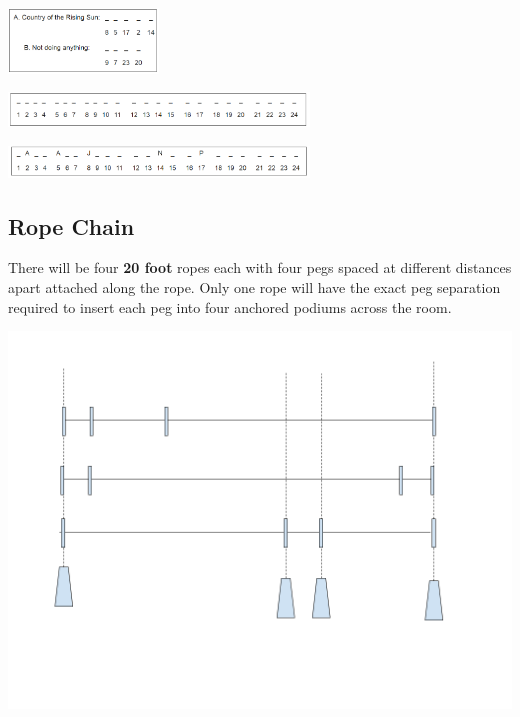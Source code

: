 \documentclass[11pt]{article}
\begin{document}
\begin{center}
\includegraphics[width=4cm]{./img/acrostic-1.png}
\end{center}

\begin{center}
\includegraphics[width=8cm]{./img/acrostic-2.png}
\end{center}

\begin{center}
\includegraphics[width=8cm]{./img/acrostic-3.png}
\end{center}

\subsection{Rope Chain}
\label{sec:orgfaf57a4}
There will be four \textbf{20 foot} ropes each with four pegs spaced at different distances apart attached along the rope. Only one rope will have the exact peg separation required to insert each peg into four anchored podiums across the room.

\begin{center}
\includegraphics[width=.9\linewidth]{./img/pt-rc-001.png}
\end{center}
\end{document}
